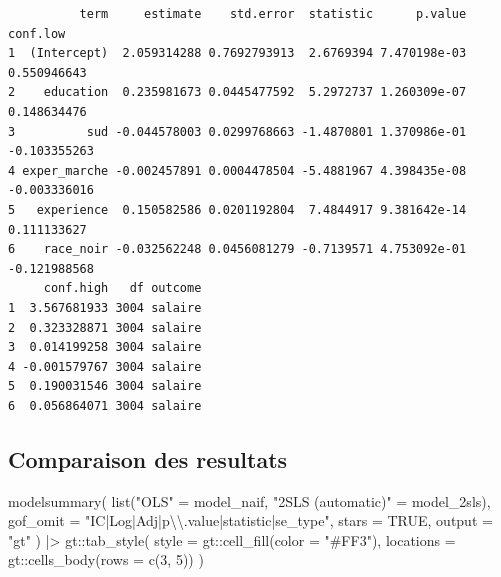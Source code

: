\documentclass[
  letterpaper,
  DIV=11,
  numbers=noendperiod]{scrartcl}
\newenvironment{Shaded}{\begin{snugshade}}{\end{snugshade}}
\newcommand{\AttributeTok}[1]{\textcolor[rgb]{0.40,0.45,0.13}{#1}}
\newcommand{\ConstantTok}[1]{\textcolor[rgb]{0.56,0.35,0.01}{#1}}
\newcommand{\DecValTok}[1]{\textcolor[rgb]{0.68,0.00,0.00}{#1}}
\newcommand{\FunctionTok}[1]{\textcolor[rgb]{0.28,0.35,0.67}{#1}}
\newcommand{\NormalTok}[1]{\textcolor[rgb]{0.00,0.23,0.31}{#1}}
\newcommand{\OtherTok}[1]{\textcolor[rgb]{0.00,0.23,0.31}{#1}}
\newcommand{\SpecialCharTok}[1]{\textcolor[rgb]{0.37,0.37,0.37}{#1}}
\newcommand{\StringTok}[1]{\textcolor[rgb]{0.13,0.47,0.30}{#1}}
\begin{document}
\begin{verbatim}
          term     estimate    std.error  statistic      p.value     conf.low
1  (Intercept)  2.059314288 0.7692793913  2.6769394 7.470198e-03  0.550946643
2    education  0.235981673 0.0445477592  5.2972737 1.260309e-07  0.148634476
3          sud -0.044578003 0.0299768663 -1.4870801 1.370986e-01 -0.103355263
4 exper_marche -0.002457891 0.0004478504 -5.4881967 4.398435e-08 -0.003336016
5   experience  0.150582586 0.0201192804  7.4844917 9.381642e-14  0.111133627
6    race_noir -0.032562248 0.0456081279 -0.7139571 4.753092e-01 -0.121988568
     conf.high   df outcome
1  3.567681933 3004 salaire
2  0.323328871 3004 salaire
3  0.014199258 3004 salaire
4 -0.001579767 3004 salaire
5  0.190031546 3004 salaire
6  0.056864071 3004 salaire
\end{verbatim}

\subsection{Comparaison des resultats}\label{comparaison-des-resultats}

\begin{Shaded}
\begin{Highlighting}[]
\FunctionTok{modelsummary}\NormalTok{(}
  \FunctionTok{list}\NormalTok{(}\StringTok{"OLS"} \OtherTok{=}\NormalTok{ model\_naif, }\StringTok{"2SLS (automatic)"} \OtherTok{=}\NormalTok{ model\_2sls),}
  \AttributeTok{gof\_omit =} \StringTok{"IC|Log|Adj|p}\SpecialCharTok{\textbackslash{}\textbackslash{}}\StringTok{.value|statistic|se\_type"}\NormalTok{,}
  \AttributeTok{stars =} \ConstantTok{TRUE}\NormalTok{,}
  \AttributeTok{output =} \StringTok{"gt"}
\NormalTok{) }\SpecialCharTok{|\textgreater{}}
\NormalTok{  gt}\SpecialCharTok{::}\FunctionTok{tab\_style}\NormalTok{(}
    \AttributeTok{style =}\NormalTok{ gt}\SpecialCharTok{::}\FunctionTok{cell\_fill}\NormalTok{(}\AttributeTok{color =} \StringTok{"\#FF3"}\NormalTok{),}
    \AttributeTok{locations =}\NormalTok{ gt}\SpecialCharTok{::}\FunctionTok{cells\_body}\NormalTok{(}\AttributeTok{rows =} \FunctionTok{c}\NormalTok{(}\DecValTok{3}\NormalTok{, }\DecValTok{5}\NormalTok{))}
\NormalTok{  )}
\end{Highlighting}
\end{Shaded}
\end{document}

